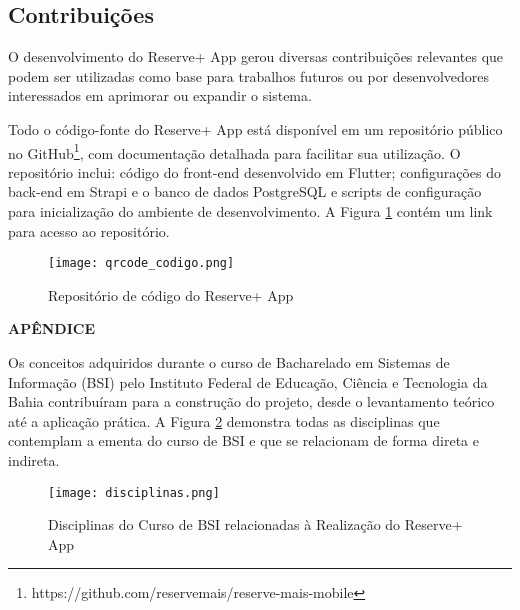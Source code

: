 \documentclass[12pt]{article}
\begin{document}
\subsection{Contribuições} \label{sec:contributions}

O desenvolvimento do Reserve+ App gerou diversas contribuições relevantes que podem ser utilizadas como base para trabalhos futuros ou por desenvolvedores interessados em aprimorar ou expandir o sistema. 

Todo o código-fonte do Reserve+ App está disponível em um repositório público no GitHub\footnote{https://github.com/reservemais/reserve-mais-mobile}, com documentação detalhada para facilitar sua utilização. O repositório inclui: código do front-end desenvolvido em Flutter; configurações do back-end em Strapi e o banco de dados PostgreSQL e scripts de configuração para inicialização do ambiente de desenvolvimento. A Figura \ref{fig:qrcode-codigo} contém um link para acesso ao repositório.

\begin{figure}[!htb]
\centering
\texttt{[image: qrcode\_codigo.png]}
\caption{Repositório de código do Reserve+ App}
\label{fig:qrcode-codigo}
\end{figure}




\newpage

\noindent\textbf{APÊNDICE}

Os conceitos adquiridos durante o curso de Bacharelado em Sistemas de Informação (BSI) pelo Instituto Federal de Educação, Ciência e Tecnologia da Bahia contribuíram para a construção do projeto, desde o levantamento teórico até a aplicação prática. A Figura \ref{fig:disciplinas} demonstra todas as disciplinas que contemplam a ementa do curso de BSI e que se relacionam de forma direta e indireta.

\begin{figure}[ht]
\centering
\texttt{[image: disciplinas.png]}
\caption{Disciplinas do Curso de BSI relacionadas à Realização do Reserve+ App}
\label{fig:disciplinas}
\end{figure}
\end{document}
